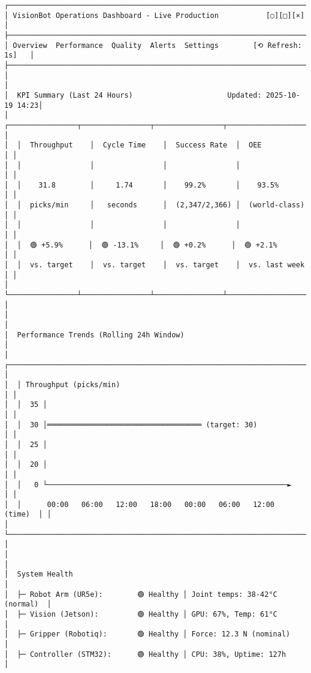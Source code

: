 \documentclass[
]{article}
\begin{document}
\begin{verbatim}
┌────────────────────────────────────────────────────────────────────────────┐
│ VisionBot Operations Dashboard - Live Production           [○][□][×]       │
├────────────────────────────────────────────────────────────────────────────┤
│ Overview  Performance  Quality  Alerts  Settings        [⟲ Refresh: 1s]   │
├────────────────────────────────────────────────────────────────────────────┤
│                                                                            │
│  KPI Summary (Last 24 Hours)                      Updated: 2025-10-19 14:23│
│  ┌────────────────┬────────────────┬────────────────┬───────────────────┐ │
│  │  Throughput    │  Cycle Time    │  Success Rate  │  OEE              │ │
│  │                │                │                │                   │ │
│  │    31.8        │     1.74       │    99.2%       │    93.5%          │ │
│  │  picks/min     │   seconds      │  (2,347/2,366) │  (world-class)    │ │
│  │                │                │                │                   │ │
│  │  🟢 +5.9%      │  🟢 -13.1%     │  🟢 +0.2%      │  🟢 +2.1%         │ │
│  │  vs. target    │  vs. target    │  vs. target    │  vs. last week    │ │
│  └────────────────┴────────────────┴────────────────┴───────────────────┘ │
│                                                                            │
│  Performance Trends (Rolling 24h Window)                                  │
│  ┌──────────────────────────────────────────────────────────────────────┐ │
│  │ Throughput (picks/min)                                               │ │
│  │  35 │                                                                 │ │
│  │  30 │════════════════════════════════════ (target: 30)              │ │
│  │  25 │                                                                 │ │
│  │  20 │                                                                 │ │
│  │   0 └────────────────────────────────────────────────────────►      │ │
│  │      00:00   06:00   12:00   18:00   00:00   06:00   12:00  (time)  │ │
│  └──────────────────────────────────────────────────────────────────────┘ │
│                                                                            │
│  System Health                                                             │
│  ├─ Robot Arm (UR5e):        🟢 Healthy │ Joint temps: 38-42°C (normal)  │
│  ├─ Vision (Jetson):         🟢 Healthy │ GPU: 67%, Temp: 61°C           │
│  ├─ Gripper (Robotiq):       🟢 Healthy │ Force: 12.3 N (nominal)        │
│  ├─ Controller (STM32):      🟢 Healthy │ CPU: 38%, Uptime: 127h         │

\end{verbatim}
\end{document}
